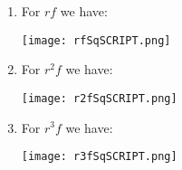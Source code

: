 \documentclass[noauthor,nooutcomes,12pt,hints,handout]{ximera}
\begin{document}
\begin{question}
\begin{freeResponse}
\begin{enumerate}
    \item For $rf$ we have:
      \begin{center}
        \texttt{[image: rfSqSCRIPT.png]}   \qquad {}
      \end{center}
    \item For $r^2f$ we have:
      \begin{center}
        \texttt{[image: r2fSqSCRIPT.png]}   \qquad {}
      \end{center}
    \item For $r^3f$ we have:
      \begin{center}
        \texttt{[image: r3fSqSCRIPT.png]}   \qquad {}
      \end{center}
    \end{enumerate}
    \end{freeResponse}
\end{question}
\mynewpage
\end{document}
